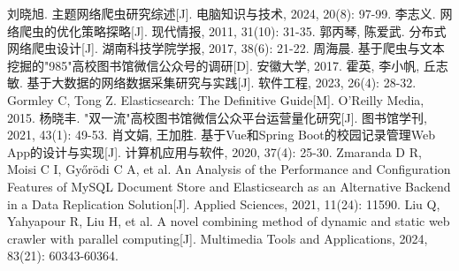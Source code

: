 \documentclass[a4paper,12pt]{ctexart}
\newcommand{\wuhao}{\fontsize{10.5pt}{15.75pt}\selectfont} %
\begin{document}
\begin{thebibliography}{99}
\songti\wuhao
{} 刘晓旭. 主题网络爬虫研究综述[J]. 电脑知识与技术, 2024, 20(8): 97-99.
 李志义. 网络爬虫的优化策略探略[J]. 现代情报, 2011, 31(10): 31-35.
 郭丙琴, 陈爱武. 分布式网络爬虫设计[J]. 湖南科技学院学报, 2017, 38(6): 21-22.
 周海晨. 基于爬虫与文本挖掘的"985"高校图书馆微信公众号的调研[D]. 安徽大学, 2017.
 霍英, 李小帆, 丘志敏. 基于大数据的网络数据采集研究与实践[J]. 软件工程, 2023, 26(4): 28-32.
 Gormley C, Tong Z. Elasticsearch: The Definitive Guide[M]. O'Reilly Media, 2015.
 杨晓丰. "双一流"高校图书馆微信公众平台运营量化研究[J]. 图书馆学刊, 2021, 43(1): 49-53.
 肖文娟, 王加胜. 基于Vue和Spring Boot的校园记录管理Web App的设计与实现[J]. 计算机应用与软件, 2020, 37(4): 25-30.
 Zmaranda D R, Moisi C I, Győrödi C A, et al. An Analysis of the Performance and Configuration Features of MySQL Document Store and Elasticsearch as an Alternative Backend in a Data Replication Solution[J]. Applied Sciences, 2021, 11(24): 11590.
 Liu Q, Yahyapour R, Liu H, et al. A novel combining method of dynamic and static web crawler with parallel computing[J]. Multimedia Tools and Applications, 2024, 83(21): 60343-60364.
\end{thebibliography}
\end{document}
